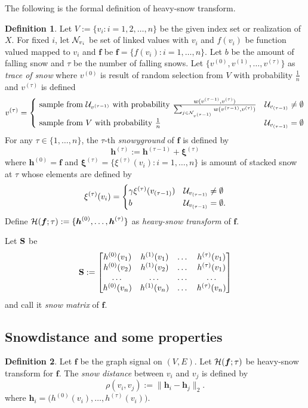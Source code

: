 \documentclass[preprint, review, 12pt]{article}
\theoremstyle{definition}
\newtheorem{dfn}{Definition}
\theoremstyle{remark}
\begin{document}
The following is the formal definition of heavy-snow transform.
\begin{dfn}\label{snow:df_hst}
Let $V:=\{v_i:i=1,2,\dots,n\}$ be the given index set or realization of $X$. For fixed $i$, let ${\cal N}_{v_i}$ be set of linked values with $v_i$ and $f(v_i)$ be function valued mapped to $v_i$ and $\boldsymbol f$ be ${\boldsymbol f}=\{f(v_i): i=1,\dots,n \}$. Let $b$ be the amount of falling snow and $\tau$ be the number of falling snows. Let $\{v^{(0)},v^{(1)},\dots,v^{(\tau)}\}$ as \emph{trace of snow} where $v^{(0)}$ is result of random selection from $V$ with probability $\frac{1}{n}$ and $v^{(\tau)}$ is defined
\[
v^{(\tau)}=\begin{cases}
\mbox{ sample from } {\cal U}_{v^{(\tau-1)}} \mbox{ with probability } \frac{w(v^{(\tau-1)},v^{(\tau)})}{\sum_{j \in {\cal N}_{v^{(\tau-1)}}}w(v^{(\tau-1)},v^{(\tau)})}  & {\cal U}_{v_{(\tau-1)}}\neq \emptyset \\ 
\mbox{ sample from } V \mbox{ with probability  } \frac{1}{n}  & {\cal U}_{v_{(\tau-1)}}= \emptyset 
\end{cases}
\]
For any $\tau \in \{1,\dots,n\}$, the $\tau$-th \emph{snowyground} of ${\boldsymbol f}$ is defined by 
\[
{\boldsymbol h}^{(\tau)} := {\boldsymbol h}^{(\tau-1)}+{\boldsymbol \xi}^{(\tau)}
\]
where ${\boldsymbol h}^{(0)}={\boldsymbol f}$ and ${\boldsymbol \xi}^{(\tau)}=\{\xi^{(\tau)}(v_i): i=1,\dots,n\}$ is amount of stacked snow at $\tau$ whose elements are defined by 
\[
\xi^{(\tau)}(v_i)=	\begin{cases}
\gamma \xi^{(\tau)}(v_{(\tau-1)})  & {\cal U}_{v_{(\tau-1)}}\neq \emptyset \\ 
b &  {\cal U}_{v_{(\tau-1)}} = \emptyset. \\ 
\end{cases}
\]
Define ${\cal H}({\boldsymbol f};\tau):=\{{\boldsymbol h}^{(0)},\dots,{\boldsymbol h}^{(\tau)}\}$ as \emph{heavy-snow transform} of ${\boldsymbol f}$. 
\end{dfn}
Let ${\bf S}$ be 
\[
{\bf S}:=\begin{bmatrix} 
h^{(0)}(v_1) & h^{(1)}(v_1) & \dots & h^{(\tau)}(v_1) \\ 
h^{(0)}(v_2) & h^{(1)}(v_2) & \dots & h^{(\tau)}(v_1) \\ 
\dots  & \dots & \dots & \dots \\ 
h^{(0)}(v_n) & h^{(1)}(v_n) & \dots & h^{(\tau)}(v_n) \end{bmatrix}
\]
and call it \emph{snow matrix} of ${\boldsymbol f}$. 
\subsection{Snowdistance and some properties} 
\begin{dfn}
Let ${\boldsymbol f}$ be the graph signal on $(V,E)$. Let ${\cal H}({\boldsymbol f};\tau)$ be heavy-snow transform for ${\boldsymbol f}$. The \emph{snow distance} between $v_i$ and $v_j$ is defined by 
\[
\rho(v_i , v_j) := \|{\boldsymbol h}_i- {\boldsymbol h}_j\|_2.
\]
where ${\boldsymbol h}_i=\big(h^{(0)}(v_i),\dots,h^{(\tau)}(v_i)\big)$.
\end{dfn}
\end{document}
